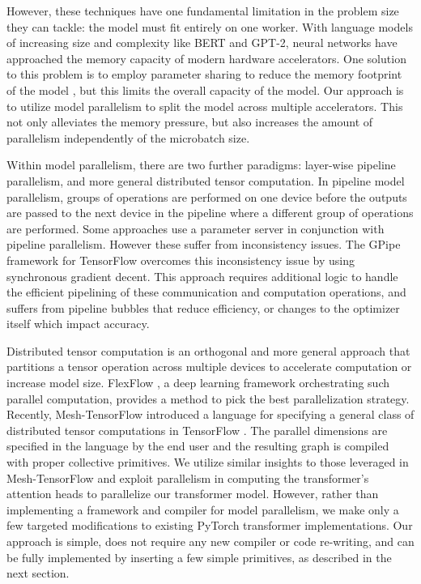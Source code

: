 However, these techniques have one fundamental limitation in the problem size they can tackle: the model must fit entirely on one worker. With language models of increasing size and complexity like BERT and GPT-2, neural networks have approached the memory capacity of modern hardware accelerators. One solution to this problem is to employ parameter sharing to reduce the memory footprint of the model \cite{ALBERT2019}, but this limits the overall capacity of the model. Our approach is to utilize model parallelism to split the model across multiple accelerators. This not only alleviates the memory pressure, but also increases the amount of parallelism independently of the microbatch size.

Within model parallelism, there are two further paradigms: layer-wise pipeline parallelism, and more general distributed tensor computation. In pipeline model parallelism, groups of operations are performed on one device before the outputs are passed to the next device in the pipeline where a different group of operations are performed. Some approaches \cite{PipeDream2018, DualPipe2018} use a parameter server \cite{ParamServer2014} in conjunction with pipeline parallelism. However these suffer from inconsistency issues. The GPipe framework for TensorFlow \cite{GPipe} overcomes this inconsistency issue by using synchronous gradient decent. This approach requires additional logic to handle the efficient pipelining of these communication and computation operations, and suffers from pipeline bubbles that reduce efficiency, or changes to the optimizer itself which impact accuracy.

Distributed tensor computation is an orthogonal and more general approach that partitions a tensor operation across multiple devices to accelerate computation or increase model size. FlexFlow \cite{FlexFlow2018}, a deep learning framework orchestrating such parallel computation, provides a method to pick the best parallelization strategy. Recently, Mesh-TensorFlow \cite{mesh_tf} introduced a language for specifying a general class of distributed tensor computations in TensorFlow \cite{tensorflow2015-whitepaper}. The parallel dimensions are specified in the language by the end user and the resulting graph is compiled with proper collective primitives. We utilize similar insights to those leveraged in Mesh-TensorFlow and exploit parallelism in computing the transformer's attention heads to parallelize our transformer model. However, rather than implementing a framework and compiler for model parallelism, we make only a few targeted modifications to existing PyTorch transformer implementations. Our approach is simple, does not require any new compiler or code re-writing, and can be fully implemented by inserting a few simple primitives, as described in the next section.